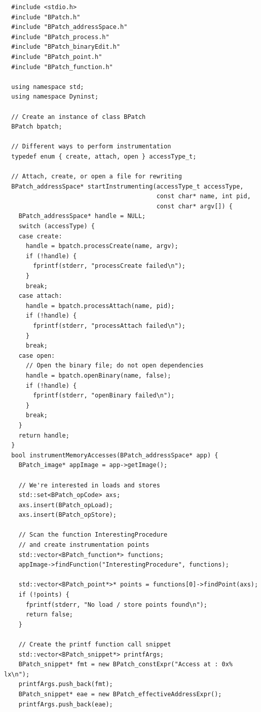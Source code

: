 \begin{lstlisting}
  #include <stdio.h>
  #include "BPatch.h"
  #include "BPatch_addressSpace.h"
  #include "BPatch_process.h"
  #include "BPatch_binaryEdit.h"
  #include "BPatch_point.h"
  #include "BPatch_function.h"

  using namespace std;
  using namespace Dyninst;

  // Create an instance of class BPatch
  BPatch bpatch;

  // Different ways to perform instrumentation
  typedef enum { create, attach, open } accessType_t;

  // Attach, create, or open a file for rewriting
  BPatch_addressSpace* startInstrumenting(accessType_t accessType,
                                          const char* name, int pid,
                                          const char* argv[]) {
    BPatch_addressSpace* handle = NULL;
    switch (accessType) {
    case create:
      handle = bpatch.processCreate(name, argv);
      if (!handle) {
        fprintf(stderr, "processCreate failed\n");
      }
      break;
    case attach:
      handle = bpatch.processAttach(name, pid);
      if (!handle) {
        fprintf(stderr, "processAttach failed\n");
      }
      break;
    case open:
      // Open the binary file; do not open dependencies
      handle = bpatch.openBinary(name, false);
      if (!handle) {
        fprintf(stderr, "openBinary failed\n");
      }
      break;
    }
    return handle;
  }
  bool instrumentMemoryAccesses(BPatch_addressSpace* app) {
    BPatch_image* appImage = app->getImage();

    // We're interested in loads and stores
    std::set<BPatch_opCode> axs;
    axs.insert(BPatch_opLoad);
    axs.insert(BPatch_opStore);

    // Scan the function InterestingProcedure
    // and create instrumentation points
    std::vector<BPatch_function*> functions;
    appImage->findFunction("InterestingProcedure", functions);

    std::vector<BPatch_point*>* points = functions[0]->findPoint(axs);
    if (!points) {
      fprintf(stderr, "No load / store points found\n");
      return false;
    }

    // Create the printf function call snippet
    std::vector<BPatch_snippet*> printfArgs;
    BPatch_snippet* fmt = new BPatch_constExpr("Access at : 0x% lx\n");
    printfArgs.push_back(fmt);
    BPatch_snippet* eae = new BPatch_effectiveAddressExpr();
    printfArgs.push_back(eae);


\end{lstlisting}
